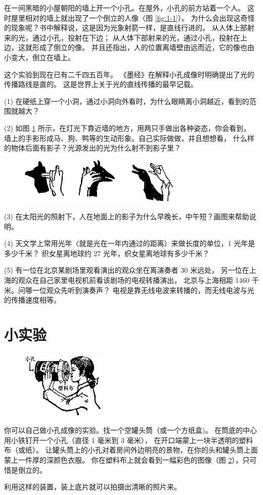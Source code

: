 在一间黑暗的小屋朝阳的墙上开一个小孔。在屋外，小孔的前方站着一个人。
这时屋里相对的墙上就出现了一个倒立的人像〈图 \ref{fig:1-1}）。
为什么会出现这奇怪的现象呢？书中解释说，这是因为光象射箭一样，是直线行进的。
从人体上部射来的光，通过小孔，投射在下边；
从人体下部射来的光，通过小孔，投射在上边，这就形成了倒立的像。
并且还指出，人的位置离墙壁由远而近，它的像也由小变大，倒立在墙上。

这个实验到现在已有二千四五百年。
《墨经》在解释小孔成像时明确提出了光的传播路线是直的。
这是世界上关于光的直线传播的最早记载。


\lianxi

(1) 在硬纸上穿一个小洞，通过小洞向外看时，为什么眼睛离小洞越近，看到的范围就越大？

(2) 如图 \ref{fig:1-2} 所示，在灯光下靠近墙的地方，用两只手做出各种姿态，你会看到，
墙上的手影形成马、狗、鸭等的生动形象。自己实际做做，并且想想看，
什么样的物体后面有影子？光源发出的光为什么射不到影子里？

\begin{figure}[htbp]
    \centering
    \includegraphics[width=0.7\textwidth]{../pic/czwl2-ch1-2}
    \caption{}\label{fig:1-2}
\end{figure}


(3) 在太阳光的照射下，人在地面上的影子为什么早晚长，中午短？画图来帮助说明。

(4) 天文学上常用光年〈就是光在一年内通过的距离）来做长度的单位，1 光年是多少千米？
织女星离地球约 27 光年，织女星离地球有多少千米？

(5) 有一位在北京某剧场里观看演出的观众坐在离演奏者 30 米远处，
另一位在上海的观众在自己家里电视机前看该剧场的电视转播演出，
北京与上海相距 1460 千米。问哪一位观众先听到演奏声？
电视是靠无线电波来转播的，而无线电波与光的传播速度相等。


\section*{小实验}

\begin{figure}
    \centering
    \includegraphics[width=4cm]{../pic/czwl2-ch1-3}
    \caption{}\label{fig:1-3}
\end{figure}

你可以自己做小孔成像的实验。找一个空罐头筒（或一个方纸盒)。
在筒底的中心用小铁钉开一个小孔（直径 1 毫米到 3 毫米），
在开口端蒙上一块半透明的塑料布（或纸）。
让罐头筒上的小孔对着房间外边明亮的景物，在你的头和罐头筒上面蒙上一件厚的深颜色衣服。
你在塑料布上就会看到一幅彩色的图像（图 \ref{fig:1-3}），只可惜是倒立的。

利用这样的装置，装上底片就可以拍摄出清晰的照片来。


